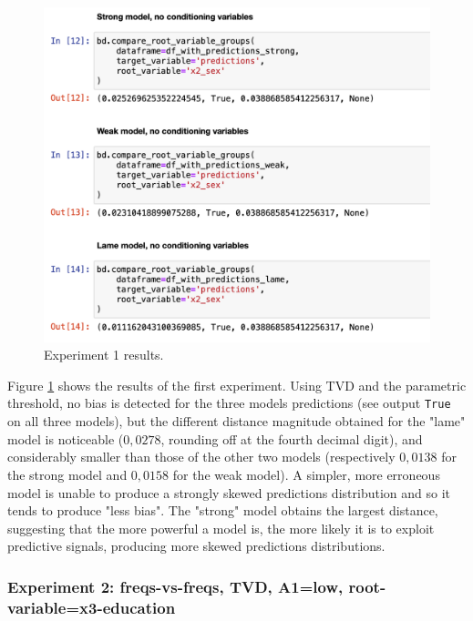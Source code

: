 \documentclass[
]{ceurart}
\begin{document}
\begin{figure}[h!]
  \includegraphics[width=.8\linewidth, left]{exp1.png}
  \caption{Experiment 1 results.}
  \label{fig:exp1}
\end{figure}
Figure \ref{fig:exp1} shows the results of the first experiment. Using TVD and the parametric threshold, no bias is detected for the three models predictions (see output \texttt{True} on all three models), but the different distance magnitude obtained for the "lame" model is noticeable ($0,0278$, rounding off at the fourth decimal digit), and considerably smaller than those of the other two models (respectively $0,0138$ for the strong model and $0,0158$ for the weak model). A simpler, more erroneous model is unable to produce a strongly skewed predictions distribution and so it tends to produce "less bias". The "strong" model obtains the largest distance, suggesting that the more powerful a model is, the more likely it is to exploit predictive signals, producing more skewed predictions distributions. 

\subsubsection{Experiment 2: freqs-vs-freqs, TVD, A1=low, root-variable=x3-education}
\end{document}
